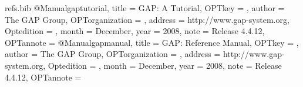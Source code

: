 \begin{filecontents*}{refs.bib}
@Manual{gaptutorial,
  title = 	 {GAP: A Tutorial},
  OPTkey = 	 {},
  author = 	 {The GAP Group},
  OPTorganization = {},
  address = 	 {http://www.gap-system.org},
  Optedition = 	 {},
  month = 	 {December},
  year = 	 {2008},
  note = 	 {Release 4.4.12},
  OPTannote = 	 {}
}
@Manual{gapmanual,
  title = 	 {GAP: Reference Manual},
  OPTkey = 	 {},
  author = 	 {The GAP Group},
  OPTorganization = {},
  address = 	 {http://www.gap-system.org},
  Optedition = 	 {},
  month = 	 {December},
  year = 	 {2008},
  note = 	 {Release 4.4.12},
  OPTannote = 	 {}
}
\end{filecontents*}


\documentclass[11pt]{amsart}
\usepackage{enumerate,amsmath,amssymb,fancyhdr,mathrsfs,amsthm,stmaryrd}
\usepackage{setspace,graphicx,fullpage}
\usepackage{tikz}
\usetikzlibrary{matrix,arrows}
\onehalfspacing
\raggedbottom

\usepackage[style = ieee, urldate = comp]{biblatex}


%

\newcommand{\gap}{GAP}   %
\newcommand{\xgap}{XGap}   %

\theoremstyle{plain}
\newtheorem{theorem} {Theorem}
\newtheorem{corollary} {Corollary}
\newtheorem*{main} {Main-Theorem}
\newtheorem{lemma} {Lemma}



